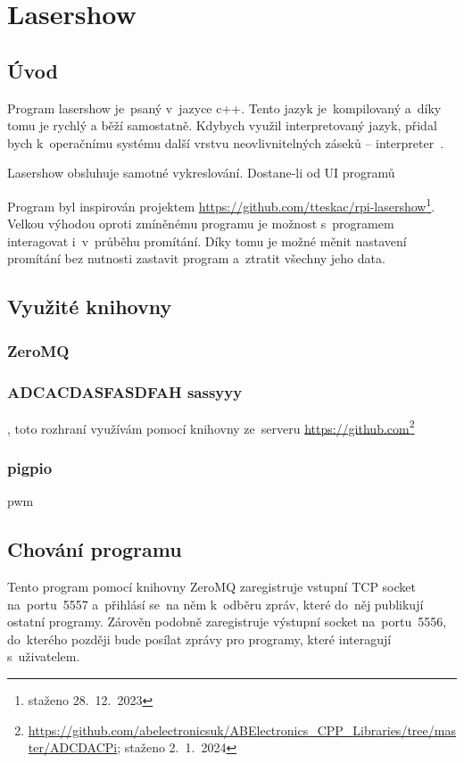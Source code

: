 \section{Lasershow}
\subsection{Úvod}

Program lasershow je~psaný v~jazyce c++. Tento jazyk je~kompilovaný a~díky tomu je rychlý a běží samostatně.
Kdybych využil interpretovaný jazyk, přidal bych k~operačnímu systému další vrstvu neovlivnitelných záseků -- interpreter~\cite{wiki-interpret}.

Lasershow obsluhuje samotné vykreslování. Dostane-li od UI programů 

Program byl inspirován projektem \url{https://github.com/tteskac/rpi-lasershow}\footnote{staženo 28.~12.~2023}.
Velkou výhodou oproti zmíněnému programu je možnost s~programem interagovat i~v~průběhu promítání. Díky tomu je možné měnit nastavení promítání bez nutnosti zastavit program a~ztratit všechny jeho data.

\subsection{Využité knihovny}
\subsubsection{ZeroMQ}
\subsubsection{ADCACDASFASDFAH sassyyy}
, toto rozhraní využívám pomocí knihovny ze~serveru \url{https://github.com}\footnote{\url{https://github.com/abelectronicsuk/ABElectronics_CPP_Libraries/tree/master/ADCDACPi}; staženo 2.~1.~2024}
\subsubsection{pigpio}
pwm

\subsection{Chování programu}
Tento program pomocí knihovny ZeroMQ zaregistruje vstupní TCP socket na~portu~5557 a~přihlásí se~na něm k~odběru zpráv, které do~něj publikují ostatní programy. Zárověn podobně zaregistruje výstupní socket na~portu~5556, do~kterého později bude posílat zprávy pro programy, které interagují s~uživatelem.

